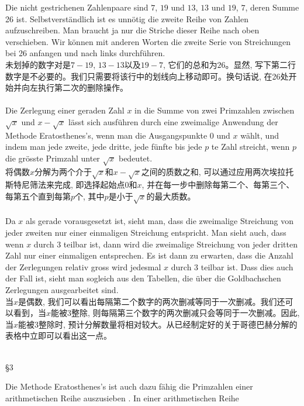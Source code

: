 \documentclass[UTF8,a4paper,zihao=-4]{article}
\begin{document}
\indent Die nicht gestrichenen Zahlenpaare sind $7$, $19$ und $13$, $13$ und $19$, $7$, deren Summe 26 ist. Selbstverständlich ist es unnötig die zweite Reihe von Zahlen aufzuschreiben. Man braucht ja nur die Striche dieser Reihe nach oben verschieben. Wir können mit anderen Worten die zweite Serie von Streichungen bei 26 anfangen und nach links durchführen.\\
\indent 未划掉的数字对是$7-19$, $13-13$以及$19-7$, 它们的总和为$26$。显然, 写下第二行数字是不必要的。我们只需要将该行中的划线向上移动即可。换句话说, 在26处开始并向左执行第二次的删除操作。\\\\
\indent Die Zerlegung einer geraden Zahl $x$ in die Summe von zwei Primzahlen zwischen $\sqrt{x}$ und $x-\sqrt{x}$ lässt sich ausführen durch eine zweimalige Anwendung der Methode Eratosthenes's, wenn man die Ausgangspunkte $0$ und $x$ wählt, und indem man jede zweite, jede dritte, jede fünfte bis jede $p$ te Zahl streicht, wenn $p$ die grösste Primzahl unter $\sqrt{x}$ bedeutet.\\
\indent 将偶数$x$分解为两个介于$\sqrt{x}$和$x-\sqrt{x}$之间的质数之和, 可以通过应用两次埃拉托斯特尼筛法来完成, 即选择起始点$0$和$x$, 并在每一步中删除每第二个、每第三个、每第五个直到每第$p$个, 其中$p$是小于$\sqrt{x}$的最大质数。\\\\
\indent Da $x$ als gerade vorausgesetzt ist, sieht man, dass die zweimalige Streichung von jeder zweiten nur einer einmaligen Streichung entspricht. Man sieht auch, dass wenn $x$ durch $3$ teilbar ist, dann wird die zweimalige Streichung von jeder dritten Zahl nur einer einmaligen entsprechen. Es ist dann zu erwarten, dass die Anzahl der Zerlegungen relativ gross wird jedesmal $x$ durch $3$ teilbar ist. Dass dies auch der Fall ist, sieht man sogleich aus den Tabellen, die über die Goldbachschen Zerlegungen ausgearbeitet sind.\\
\indent 当$x$是偶数, 我们可以看出每隔第二个数字的两次删减等同于一次删减。我们还可以看到，当$x$能被3整除, 则每隔第三个数字的两次删减只会等同于一次删减。因此, 当$x$能被3整除时, 预计分解数量将相对较大。从已经制定好的关于哥德巴赫分解的表格中立即可以看出这一点。\\\\
\vspace{2em}
\begin{center}§3\end{center}
\indent\indent Die Methode Eratosthenes's ist auch dazu fähig die Primzahlen einer arithmetischen Reihe auszusieben . In einer arithmetischen Reihe\\
\end{document}

